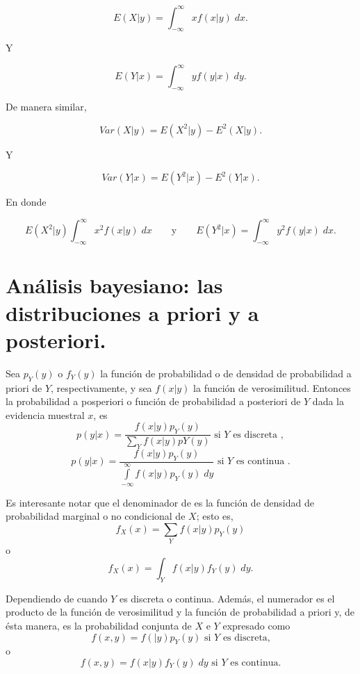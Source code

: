 \begin{tcolorbox}
    $$E(X|y)=\int_{-\infty}^\infty xf(x|y)\; dx.$$
\end{tcolorbox}

Y 

\begin{tcolorbox}
    $$E(Y|x)=\int_{-\infty}^\infty yf(y|x)\; dy.$$
\end{tcolorbox}

De manera similar,

\begin{tcolorbox}
    $$Var(X|y)=E\left(X^2|y\right)-E^2(X|y).$$
\end{tcolorbox}

Y 

\begin{tcolorbox}
    $$Var(Y|x)=E\left(Y^2|x\right)-E^2(Y|x).$$
\end{tcolorbox}

En donde 

$$E\left(X^2|y\right)\int_{-\infty}^\infty x^2 f(x|y)\; dx \qquad \mbox{y}\qquad E\left(Y^2|x\right)=\int_{-\infty}^\infty y^2f(y|x)\; dx.$$


\section{Análisis bayesiano: las distribuciones a priori y a posteriori.}

\begin{teo}
    Sea $p_Y(y)$ o $f_Y(y)$ la función de probabilidad o de densidad de probabilidad a priori de $Y$, respectivamente, y sea $f(x|y)$ la función de verosimilitud. Entonces la probabilidad a posperiori o función de probabilidad a posteriori de $Y$ dada la evidencia muestral $x$, es
    $$p(y|x)=\dfrac{f(x|y)p_Y(y)}{\sum\limits_{Y}f(x|y)pY(y)} \mbox{ si } Y \mbox{ es discreta },$$
    $$p(y|x)=\dfrac{f(x|y)p_Y(y)}{\int\limits_{-\infty}^\infty f(x|y)p_Y(y)\; dy} \mbox{ si } Y \mbox{ es continua }.$$
\end{teo}

Es interesante notar que el denominador de es la función de densidad de probabilidad marginal o no condicional de $X$; esto es,
$$f_X(x)=\sum_Y f(x|y)p_Y(y)$$
o 
$$f_X(x)=\int_Y f(x|y)f_Y(y)\; dy.$$

Dependiendo de cuando $Y$ es discreta o continua. Además, el numerador es el producto de la función de verosimilitud y la función de probabilidad a priori y, de ésta manera, es la probabilidad conjunta de $X$ e $Y$ expresado como
$$f(x,y)=f(|y)p_Y(y) \mbox{ si } Y \mbox{ es discreta,}$$
o
$$f(x,y)=f(x|y)f_Y(y)\; dy \mbox{ si } Y \mbox{ es continua.}$$

